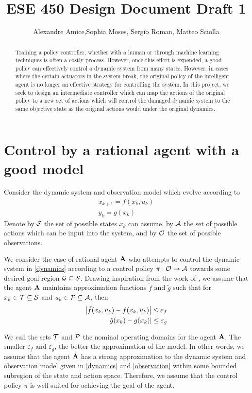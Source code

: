 \documentclass[a4paper,10pt]{article}
\title{ESE 450 Design Document Draft 1}
\author{Alexandre Amice,Sophia Moses, Sergio Roman, Matteo Sciolla}
\begin{document}
\maketitle

\begin{abstract}
Training a policy controller, whether with a human or through machine learning techniques is often a costly process. However, once this effort is expended, a good policy can effectively control a dynamic system from many states. However, in cases where the certain actuators in the system break, the original policy of the intelligent agent is no longer an effective strategy for controlling the system. In this project, we seek to design an intermediate controller which can map the actions of the original policy to a new set of actions which will control the damaged dynamic system to the same objective state as the original actions would under the original dynamics.
\end{abstract}

\section{Control by a rational agent with a good model}
Consider the dynamic system and observation model which evolve according to
\begin{align}
 x_{k+1} = f(x_k, u_k) \label{dynamics}\\
 y_k = g(x_k) \label{observation}
\end{align}
Denote by $\mathcal{S}$ the set of possible states $x_k$ can assume, by $\mathcal{A}$ the set of possible actions which can be input into the system, and by $\mathcal{O}$ the set of possible observations.

We consider the case of rational agent $\mathbf{A}$ who attempts to control the dynamic system in \eqref{dynamics} according to a control policy $\pi : \mathcal{O} \rightarrow \mathcal{A}$ towards some desired goal region $\mathcal{G} \subseteq \mathcal{S}$. Drawing inspiration from the work of \cite{Dragan2019}, we assume that the agent $\mathbf{A}$ maintains approximation functions $\tilde f$ and $\tilde g$ such that for $x_k \in \mathcal{T} \subseteq \mathcal{S}$ and $u_k \in \mathcal{P} \subseteq \mathcal{A}$, then
\begin{align*}
 {\left\vert \tilde f(x_k, u_k) - f(x_k,u_k)  \right\vert} \leq \varepsilon_f \\
 {\left\vert \tilde g(x_k) - g(x_k) \right\vert} \leq \varepsilon_g
\end{align*}

We call the sets $\mathcal{T}$ and $\mathcal{P}$ the nominal operating domains for the agent $\mathbf{A}$. The smaller $\varepsilon_f$ and $\varepsilon_g$, the better the approximation of the model. In other words, we assume that the agent $\mathbf{A}$ has a strong approximation to the dynamic system and observation model given in \eqref{dynamics} and \eqref{observation} within some bounded subregion of the state and action space. Therefore, we assume that the control policy $\pi$ is well suited for achieving the goal of the agent.
\end{document}
